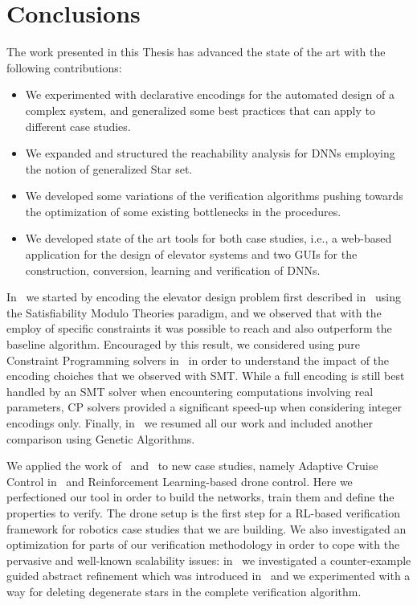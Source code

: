 \section{Conclusions}
\label{sec:concl}
%
The work presented in this Thesis has advanced the state of the art with the
following contributions:
%
\begin{itemize}
	\item We experimented with declarative encodings for the automated design
		of a complex system, and generalized some best practices that can
		apply to different case studies.
	\item We expanded and structured the reachability analysis for DNNs employing
		the notion of generalized Star set.
	\item We developed some variations of the verification algorithms pushing
		towards the optimization of some existing bottlenecks in the procedures.
	\item We developed state of the art tools for both case studies, i.e., a
		web-based application for the design of elevator systems and two GUIs
		for the construction, conversion, learning and verification of DNNs.
\end{itemize}
%
In~\cite{AiLift2} we started by encoding the elevator design problem first described
in~\cite{AiLift} using the Satisfiability Modulo Theories paradigm, and we observed that
with the employ of specific constraints it was possible to reach and also outperform the
baseline algorithm. Encouraged by this result, we considered using pure Constraint 
Programming solvers in~\cite{AiLift3} in order to understand the impact of the encoding
choiches that we observed with SMT. While a full encoding is still best handled by an
SMT solver when encountering computations involving real parameters, CP solvers provided
a significant speed-up when considering integer encodings only. Finally, in~\cite{AiLift4}
we resumed all our work and included another comparison using Genetic Algorithms.

We applied the work of~\cite{DBLP:conf/ecai/GuidottiLPT20} and~\cite{guidotti2021pynever} 
to new case studies, namely Adaptive Cruise Control in~\cite{DBLP:conf/ecms/DemarchiGPT22} 
and Reinforcement Learning-based drone control. Here we perfectioned our tool \nevertwo{} 
in order to build the networks, train them and define the properties to verify. The 
drone setup is the first step for a RL-based verification framework for robotics case 
studies that we are building. We also investigated an optimization for parts of our 
verification methodology in order to cope with the pervasive and well-known scalability 
issues: in~\cite{DBLP:conf/cpsschool/DemarchiG22} we investigated a counter-example guided
abstract refinement which was introduced in~\cite{DBLP:phd/basesearch/Guidotti22} and we 
experimented with a way for deleting degenerate stars in the complete verification algorithm.

